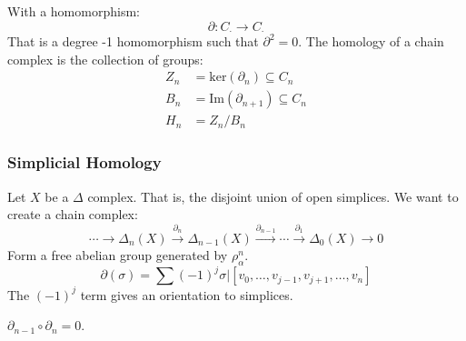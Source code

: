 \documentclass{book}                                                           %
\begin{document}
                    With a homomorphism:
                    \begin{equation}
                        \partial:C_{\cdot}\rightarrow{C}_{\cdot}
                    \end{equation}
                    That is a degree -1 homomorphism such that
                    $\partial^{2}=0$. The homology of a chain
                    complex is the collection of groups:
                    \begin{align}
                        Z_{n}&=\mathrm{ker}(\partial_{n})
                            \subseteq{C}_{n}\\
                        B_{n}&=\mathrm{Im}(\partial_{n+1})
                            \subseteq{C}_{n}\\
                        H_{n}&=Z_{n}/B_{n}
                    \end{align}
                \subsubsection{Simplicial Homology}
                    Let $X$ be a $\Delta$ complex. That is, the
                    disjoint union of open simplices. We want to create
                    a chain complex:
                    \begin{equation}
                        \cdots\longrightarrow\Delta_{n}(X)
                        \overset{\partial_{n}}{\longrightarrow}
                        \Delta_{n-1}(X)
                        \overset{\partial_{n-1}}{\longrightarrow}
                        \cdots
                        \overset{\partial_{1}}{\longrightarrow}
                        \Delta_{0}(X)
                        \longrightarrow{0}
                    \end{equation}
                    Form a free abelian group generated by
                    $\rho_{\alpha}^{n}$.
                    \begin{equation}
                        \partial(\sigma)=
                        \sum(\minus{1})^{j}\sigma|
                        [v_{0},\dots,v_{j-1},v_{j+1},\dots,v_{n}]
                    \end{equation}
                    The $(\minus{1})^{j}$ term gives an orientation
                    to simplices.
                    \begin{theorem}
                        $\partial_{n-1}\circ\partial_{n}=0$.
                    \end{theorem}
\end{document}
